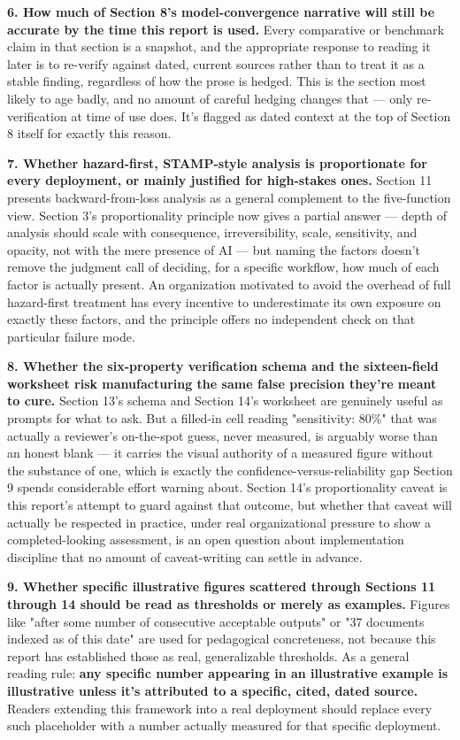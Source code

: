 \textbf{6. How much of Section 8's model-convergence narrative will still be accurate by the time this report is used.} Every comparative or benchmark claim in that section is a snapshot, and the appropriate response to reading it later is to re-verify against dated, current sources rather than to treat it as a stable finding, regardless of how the prose is hedged. This is the section most likely to age badly, and no amount of careful hedging changes that --- only re-verification at time of use does. It's flagged as dated context at the top of Section 8 itself for exactly this reason.

\textbf{7. Whether hazard-first, STAMP-style analysis is proportionate for every deployment, or mainly justified for high-stakes ones.} Section 11 presents backward-from-loss analysis as a general complement to the five-function view. Section 3's proportionality principle now gives a partial answer --- depth of analysis should scale with consequence, irreversibility, scale, sensitivity, and opacity, not with the mere presence of AI --- but naming the factors doesn't remove the judgment call of deciding, for a specific workflow, how much of each factor is actually present. An organization motivated to avoid the overhead of full hazard-first treatment has every incentive to underestimate its own exposure on exactly these factors, and the principle offers no independent check on that particular failure mode.

\textbf{8. Whether the six-property verification schema and the sixteen-field worksheet risk manufacturing the same false precision they're meant to cure.} Section 13's schema and Section 14's worksheet are genuinely useful as prompts for what to ask. But a filled-in cell reading "sensitivity: 80\%" that was actually a reviewer's on-the-spot guess, never measured, is arguably worse than an honest blank --- it carries the visual authority of a measured figure without the substance of one, which is exactly the confidence-versus-reliability gap Section 9 spends considerable effort warning about. Section 14's proportionality caveat is this report's attempt to guard against that outcome, but whether that caveat will actually be respected in practice, under real organizational pressure to show a completed-looking assessment, is an open question about implementation discipline that no amount of caveat-writing can settle in advance.

\textbf{9. Whether specific illustrative figures scattered through Sections 11 through 14 should be read as thresholds or merely as examples.} Figures like "after some number of consecutive acceptable outputs" or "37 documents indexed as of this date" are used for pedagogical concreteness, not because this report has established those as real, generalizable thresholds. As a general reading rule: \textbf{any specific number appearing in an illustrative example is illustrative unless it's attributed to a specific, cited, dated source.} Readers extending this framework into a real deployment should replace every such placeholder with a number actually measured for that specific deployment.

